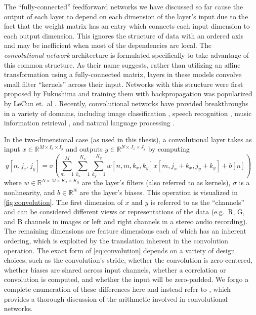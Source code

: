 The ``fully-connected'' feedforward networks we have discussed so far cause the output of each layer to depend on each dimension of the layer's input due to the fact that the weight matrix has an entry which connects each input dimension to each output dimension.
This ignores the structure of data with an ordered axis and may be inefficient when most of the dependencies are local.
The {\em convolutional network} architecture is formulated specifically to take advantage of this common structure.
As their name suggests, rather than utilizing an affine transformation using a fully-connected matrix, layers in these models convolve small filter ``kernels'' across their input.
Networks with this structure were first proposed by Fukushima \cite{} and training them with backpropagation was popularized by LeCun et.\ al \cite{}.
Recently, convolutional networks have provided breakthroughs in a variety of domains, including image classification \cite{}, speech recognition \cite{}, music information retrieval \cite{}, and natural language processing \cite{}.

In the two-dimensional case (as used in this thesis), a convolutional layer takes as input $x \in \mathbb{R}^{M \times I_x \times I_y}$ and outputs $y \in \mathbb{R}^{N \times J_x \times J_y}$ by computing
\begin{equation}
        y[n, j_x, j_y] = \sigma\left(\sum_{m = 1}^M \sum_{k_x = 1}^{K_x} \sum_{k_y = 1}^{K_y} w[n, m, k_x, k_y] x[m, j_x + k_x, j_y + k_y] + b[n]\right)
\label{eq:convolution}
\end{equation}
where $w \in \mathbb{R}^{N \times M \times K_x \times K_y}$ are the layer's filters (also referred to as kernels), $\sigma$ is a nonlinearity, and $b \in \mathbb{R}^N$ are the layer's biases.
This operation is visualized in \cref{fig:convolution}.
The first dimension of $x$ and $y$ is referred to as the ``channels'' and can be considered different views or representations of the data (e.g.\ R, G, and B channels in images or left and right channels in a stereo audio recording).
The remaining dimensions are feature dimensions each of which has an inherent ordering, which is exploited by the translation inherent in the convolution operation.
The exact form of \cref{eq:convolution} depends on a variety of design choices, such as the convolution's stride, whether the convolution is zero-centered, whether biases are shared across input channels, whether a correlation or convolution is computed, and whether the input will be zero-padded.
We forgo a complete enumeration of these differences here and instead refer to \cite{}, which provides a thorough discussion of the arithmetic involved in convolutional networks.

